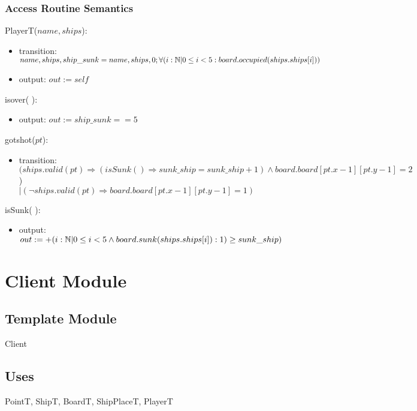 \documentclass[12pt]{article}
\begin{document}
\subsubsection* {Access Routine Semantics}

\noindent PlayerT($name,ships$):
\begin{itemize}
\item transition: $name,ships,ship\_sunk = name,ships,0 ; \\
\forall (i:\mathbb{N} | 0 \leq i < 5: board.occupied(ships.ships[i]))$
\item output: $out := \mathit{self}$
\end{itemize}

\noindent isover( ):
\begin{itemize}
\item output: $out := ship\_sunk == 5$
\end{itemize}

\noindent gotshot($pt$):
\begin{itemize}
\item transition: $(ships.valid(pt) \Rightarrow (isSunk() \Rightarrow
sunk\_ship = sunk\_ship + 1) \wedge board.board[pt.x-1][pt.y-1]=2$) \\
$| (\neg ships.valid(pt) \Rightarrow board.board[pt.x-1][pt.y-1]=1)$
\end{itemize}

\noindent isSunk( ):
\begin{itemize}
\item output: $ out:= +(i : \mathbb{N} | 0 \leq i < 5 \wedge
board.sunk(ships.ships[i]) : 1) \\ \geq sunk\_ship)$
\end{itemize}


\newpage
\section* {Client Module}

\subsection* {Template Module}

Client

\subsection* {Uses}

PointT, ShipT, BoardT, ShipPlaceT, PlayerT
\end{document}
